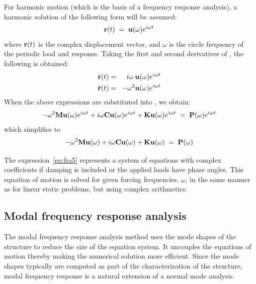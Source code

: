 For harmonic motion (which is the basis of a frequency response analysis),
a harmonic solution of the following form will be assumed:
%
\begin{equation}
\label{eq:fra1}
{\bf r}(t) \;=\; {\bf u}(\omega)e^{i\omega t}
\end{equation}
%
where ${\bf r}(t)$ is the complex displacement vector,
and $\omega$ is the circle frequency of the periodic load and response.
Taking the first and second derivatives of ,
the following is obtained:
%
\begin{eqnarray}
\label{eq:fra2}
\dot{\bf r}(t) &=& \;\:i\omega\:{\bf u}(\omega)e^{i\omega t} \\
\label{eq:fra3}
\ddot{\bf r}(t) &=& \!-\omega^2{\bf u}(\omega)e^{i\omega t}
\end{eqnarray}
%
When the above expressions are substituted into , we obtain:
%
\begin{equation}
\label{eq:fra4}
-\omega^2{\bf M u}(\omega)e^{i\omega t} +
i\omega  {\bf C u}(\omega)e^{i\omega t} +
         {\bf K u}(\omega)e^{i\omega t} \;=\; {\bf P}(\omega)e^{i\omega t}
\end{equation}
%
which simplifies to
%
\begin{equation}
\label{eq:fra5}
-\omega^2{\bf M}{\bf u}(\omega) +
 i\omega {\bf C}{\bf u}(\omega) +
         {\bf K}{\bf u}(\omega) \;=\; {\bf P}(\omega)
\end{equation}

The expression~\eqref{eq:fra5} represents a system of equations with complex
coefficients if damping is included or the applied loads have phase angles.
This equation of motion is solved for given forcing frequencies, $\omega$,
in the same manner as for linear static problems, but using complex arithmetics.

\subsection{Modal frequency response analysis}
\label{subs:Modal frequency response analysis}

The modal frequency response analysis method
uses the mode shapes of the structure to reduce the size of the equation system.
It uncouples the equations of motion thereby making the numerical solution more
efficient. Since the mode shapes typically are computed as part of the
characterization of the structure, modal frequency response is a natural
extension of a normal mode analysis.

